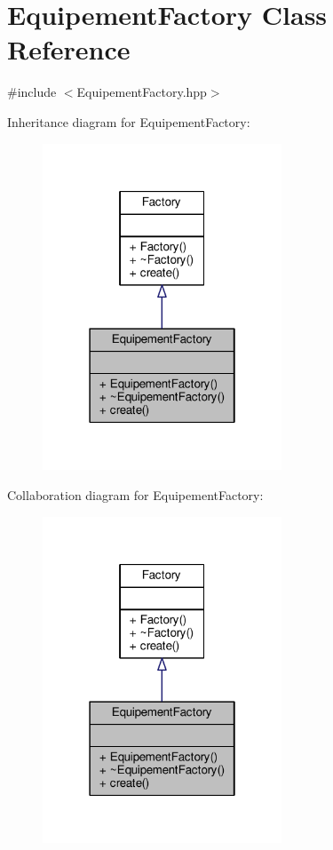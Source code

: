 \hypertarget{class_equipement_factory}{\section{Equipement\-Factory Class Reference}
\label{class_equipement_factory}
}


{\ttfamily \#include $<$Equipement\-Factory.\-hpp$>$}



Inheritance diagram for Equipement\-Factory\-:\nopagebreak
\begin{figure}[H]
\begin{center}
\leavevmode
\includegraphics[width=202pt]{class_equipement_factory__inherit__graph}
\end{center}
\end{figure}


Collaboration diagram for Equipement\-Factory\-:\nopagebreak
\begin{figure}[H]
\begin{center}
\leavevmode
\includegraphics[width=202pt]{class_equipement_factory__coll__graph}
\end{center}
\end{figure}
